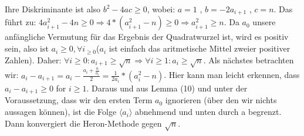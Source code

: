 \documentclass[course=erap]{aspdoc}
\begin{document}
Ihre Diskriminante ist also $b^2-4ac\geq0$, wobei: $a=1$ , $b=-2a_{i+1}$ , $c=n$. Das führt zu:
$ 4a_{i+1}^2-4n\geq0 \Rightarrow 4*(a_{i+1}^2-n)\geq0 \Rightarrow
    a_{i+1}^2 \geq n$. Da $a_0$ unsere anfängliche Vermutung für das Ergebnis der Quadratwurzel ist, wird es positiv sein, also ist $a_i \geq 0 ,\forall i_{\geq 0} $($a_i$ ist einfach das aritmetische Mittel zweier positiver Zahlen). Daher:
$  \forall i\geq0 : a_{i+1}\geq\sqrt{n} \Rightarrow
    \forall i\geq1 : a_i \geq \sqrt{n}$. Als nächstes betrachten wir:
$a_i-a_{i+1}=a_i - \frac{a_i + \frac{n}{a_i}}{2}=
    \frac{1}{2a_i}*(a_i^2-n)$. Hier kann man leicht erkennen, dass
$a_i-a_{i+1} \geq0$ for $i\geq1$. Daraus und aus Lemma (10) und unter der Voraussetzung, dass wir den ersten Term $a_0$ ignorieren (über den wir nichts aussagen können), ist die Folge $\langle a_i \rangle$ abnehmend und unten durch a begrenzt.
Dann konvergiert die Heron-Methode gegen $\sqrt{n}$.\\
\end{document}
